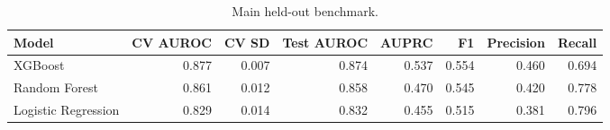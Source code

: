 \begin{table}[htbp]
\centering
\caption{Main held-out benchmark.}
\label{tab:main_benchmark_recomputed}
\begin{tabular}{lrrrrrrr}
\toprule
Model & CV AUROC & CV SD & Test AUROC & AUPRC & F1 & Precision & Recall \\
\midrule
XGBoost & 0.877 & 0.007 & 0.874 & 0.537 & 0.554 & 0.460 & 0.694 \\
Random Forest & 0.861 & 0.012 & 0.858 & 0.470 & 0.545 & 0.420 & 0.778 \\
Logistic Regression & 0.829 & 0.014 & 0.832 & 0.455 & 0.515 & 0.381 & 0.796 \\
\bottomrule
\end{tabular}

\end{table}
